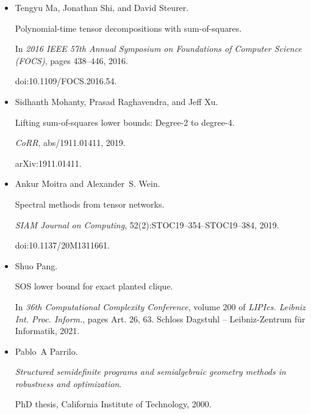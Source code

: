 \begin{itemize}
\item[] 
[34]

Tengyu Ma, Jonathan Shi, and David Steurer.


Polynomial-time tensor decompositions with sum-of-squares.


In \emph{2016 IEEE 57th Annual Symposium on Foundations of Computer
Science (FOCS)}, pages 438–446, 2016.


doi:10.1109/FOCS.2016.54.





\item[] 
[35]

Sidhanth Mohanty, Prasad Raghavendra, and Jeff Xu.


Lifting sum-of-squares lower bounds: Degree-2 to degree-4.


\emph{CoRR}, abs/1911.01411, 2019.


arXiv:1911.01411.





\item[] 
[36]

Ankur Moitra and Alexander S. Wein.


Spectral methods from tensor networks.


\emph{SIAM Journal on Computing}, 52(2):STOC19–354–STOC19–384,
2019.


doi:10.1137/20M1311661.





\item[] 
[37]

Shuo Pang.


SOS lower bound for exact planted clique.


In \emph{36th Computational Complexity Conference}, volume 200
of \emph{LIPIcs. Leibniz Int. Proc. Inform.}, pages Art. 26, 63. Schloss
Dagstuhl – Leibniz-Zentrum für Informatik, 2021.





\item[] 
[38]

Pablo A Parrilo.


\emph{Structured semidefinite programs and semialgebraic geometry
methods in robustness and optimization}.


PhD thesis, California Institute of Technology, 2000.






\end{itemize}
